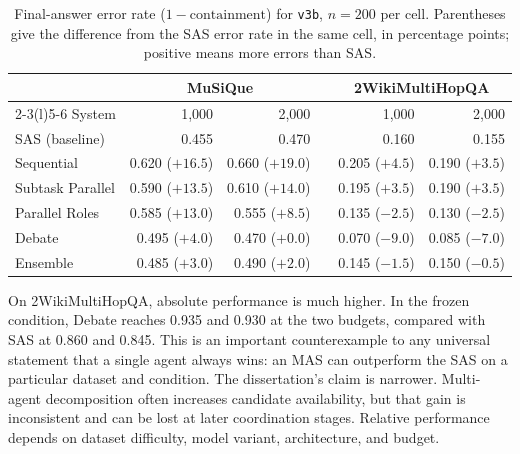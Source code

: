 \begin{table}[htbp]
  \centering
  \small
  \caption[Final-answer error rates for v3b, SAS versus each MAS]{Final-answer error rate
  ($1-\mathrm{containment}$) for \texttt{v3b}, $n=200$ per cell. Parentheses give the
  difference from the SAS error rate in the same cell, in percentage points; positive means
  more errors than SAS.}
  \label{tab:sas-gap-v3b}
  \begin{tabular}{@{}lrrcrr@{}}
    \toprule
    & \multicolumn{2}{c}{MuSiQue} & & \multicolumn{2}{c}{2WikiMultiHopQA} \\
    \cmidrule(r){2-3}\cmidrule(l){5-6}
    System & 1,000 & 2,000 & & 1,000 & 2,000 \\
    \midrule
    SAS (baseline) & 0.455 & 0.470 & & 0.160 & 0.155 \\
    \addlinespace
    Sequential & 0.620 ($+16.5$) & 0.660 ($+19.0$) & & 0.205 ($+4.5$) & 0.190 ($+3.5$) \\
    Subtask Parallel & 0.590 ($+13.5$) & 0.610 ($+14.0$) & & 0.195 ($+3.5$) & 0.190 ($+3.5$) \\
    Parallel Roles & 0.585 ($+13.0$) & 0.555 ($+8.5$) & & 0.135 ($-2.5$) & 0.130 ($-2.5$) \\
    Debate & 0.495 ($+4.0$) & 0.470 ($+0.0$) & & 0.070 ($-9.0$) & 0.085 ($-7.0$) \\
    Ensemble & 0.485 ($+3.0$) & 0.490 ($+2.0$) & & 0.145 ($-1.5$) & 0.150 ($-0.5$) \\
    \bottomrule
  \end{tabular}
\end{table}

On 2WikiMultiHopQA, absolute performance is much higher. In the frozen condition, Debate reaches 0.935 and 0.930 at the two budgets, compared with SAS at 0.860 and 0.845. This is an important counterexample to any universal statement that a single agent always wins: an MAS can outperform the SAS on a particular dataset and condition. The dissertation's claim is narrower. Multi-agent decomposition often increases candidate availability, but that gain is inconsistent and can be lost at later coordination stages. Relative performance depends on dataset difficulty, model variant, architecture, and budget.

